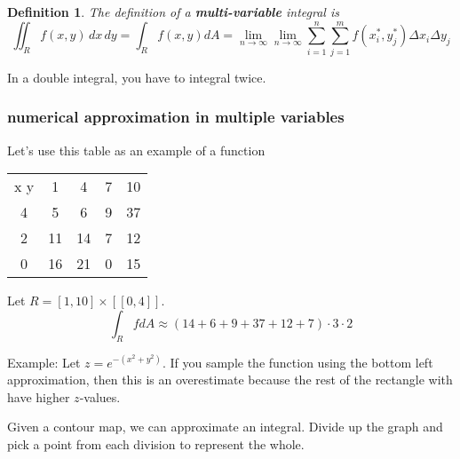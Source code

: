 \documentclass[11pt]{article}
\newtheorem{defn}{Definition}
\begin{document}
\begin{defn}
  The definition of a \textbf{multi-variable} integral is
  \[\iint_R f(x,y) \,dx \,dy = \int_R f(x,y) dA = \lim_{n\to \infty} \lim_{n \to \infty} \sum_{i=1}^n \sum_{j=1}^m f(x_i^*, y_j^*) \Delta x_i \Delta y_j\]
\end{defn}
In a double integral, you have to integral twice.
\subsubsection{numerical approximation in multiple variables}
Let's use this table as an example of a function

\begin{table}
  \centering
  \begin{tabular}{c c c c c}
    x y &1 &4& 7 &10\\
    4 & 5 & 6 & 9 & 37 \\
    2 & 11 & 14 & 7 & 12 \\
    0 & 16 & 21 & 0 & 15
  \end{tabular}
\end{table}
Let $R = [1,10] \times [[0,4]]$.
\[\int_R f dA \approx (14 + 6 + 9 + 37 + 12 + 7)\cdot3\cdot 2\]

Example: Let $z = e^{-(x^2+y^2)}$. If you sample the function using the bottom left approximation,
then this is an overestimate because the rest of the rectangle with have higher $z$-values.

Given a contour map, we can approximate an integral. Divide up the graph and pick a point
from each division to represent the whole.
\end{document}
